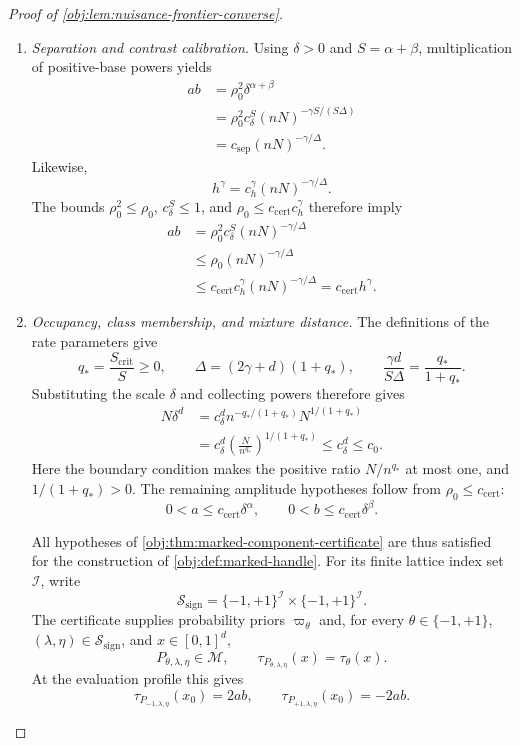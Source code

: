 \documentclass[11pt]{article}
\begin{document}
\begin{proof}[Proof of \cref{obj:lem:nuisance-frontier-converse}]
\begin{enumerate}
\item \textit{Separation and contrast calibration.}
Using \(\delta>0\) and \(S=\alpha+\beta\), multiplication of positive-base powers yields
\[
\begin{aligned}
ab
&=\rho_0^2\delta^{\alpha+\beta}\\
&=\rho_0^2c_\delta^S
  (nN)^{-\gamma S/(S\Delta)}\\
&=c_{\mathrm{sep}}(nN)^{-\gamma/\Delta}.
\end{aligned}
\]
Likewise,
\[
h^\gamma=c_h^\gamma(nN)^{-\gamma/\Delta}.
\]
The bounds \(\rho_0^2\le\rho_0\), \(c_\delta^S\le1\), and \(\rho_0\le c_{\mathrm{cert}}c_h^\gamma\) therefore imply
\[
\begin{aligned}
ab
&=\rho_0^2c_\delta^S(nN)^{-\gamma/\Delta}\\
&\le\rho_0(nN)^{-\gamma/\Delta}\\
&\le c_{\mathrm{cert}}c_h^\gamma(nN)^{-\gamma/\Delta}
=c_{\mathrm{cert}}h^\gamma.
\end{aligned}
\]

\item \textit{Occupancy, class membership, and mixture distance.}
The definitions of the rate parameters give
\[
q_*=\frac{S_{\mathrm{crit}}}{S}\ge0,\qquad
\Delta=(2\gamma+d)(1+q_*),\qquad
\frac{\gamma d}{S\Delta}=\frac{q_*}{1+q_*}.
\]
Substituting the scale \(\delta\) and collecting powers therefore gives
\[
\begin{aligned}
N\delta^d
&=c_\delta^d
  n^{-q_*/(1+q_*)}N^{1/(1+q_*)}\\
&=c_\delta^d
  \left(\frac{N}{n^{q_*}}\right)^{1/(1+q_*)}
\le c_\delta^d\le c_0.
\end{aligned}
\]
Here the boundary condition makes the positive ratio \(N/n^{q_*}\) at most one, and \(1/(1+q_*)>0\). The remaining amplitude hypotheses follow from \(\rho_0\le c_{\mathrm{cert}}\):
\[
0<a\le c_{\mathrm{cert}}\delta^\alpha,\qquad
0<b\le c_{\mathrm{cert}}\delta^\beta.
\]

All hypotheses of \cref{obj:thm:marked-component-certificate} are thus satisfied for the construction of \cref{obj:def:marked-handle}. For its finite lattice index set \(\mathcal I\), write
\[
\mathcal S_{\mathrm{sign}}
=\{-1,+1\}^{\mathcal I}\times\{-1,+1\}^{\mathcal I}.
\]
The certificate supplies probability priors \(\varpi_\theta\) and, for every
\(\theta\in\{-1,+1\}\), \((\lambda,\eta)\in\mathcal S_{\mathrm{sign}}\), and \(x\in[0,1]^d\),
\[
P_{\theta,\lambda,\eta}\in\mathcal M,\qquad
\tau_{P_{\theta,\lambda,\eta}}(x)=\tau_\theta(x).
\]
At the evaluation profile this gives
\[
\tau_{P_{-1,\lambda,\eta}}(x_0)=2ab,\qquad
\tau_{P_{+1,\lambda,\eta}}(x_0)=-2ab.
\]


\end{enumerate}
\end{proof}
\end{document}
